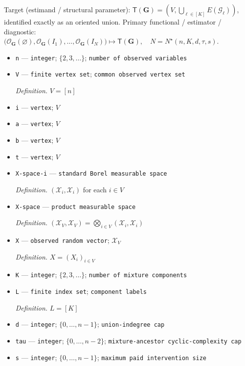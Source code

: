 \documentclass{article}
\begin{document}
Target (estimand / structural parameter): \(\mathsf T(\mathbf G)=(V,\bigcup_{\ell\in[K]}E(\mathcal G_\ell))\), identified exactly as an oriented union.
Primary functional / estimator / diagnostic: \(\bigl(\mathcal O_{\mathbf G}(\varnothing),\mathcal O_{\mathbf G}(I_1),\ldots,\mathcal O_{\mathbf G}(I_N)\bigr)\mapsto\mathsf T(\mathbf G),\quad N=N^{\star}(n,K,d,\tau,s)\).
\begin{itemize}
  \item \texttt{n} --- \texttt{integer}; \(\{2,3,\ldots\}\); \texttt{number of observed variables}
  \item \texttt{V} --- \texttt{finite vertex set}; \texttt{common observed vertex set}
  \par\smallskip\noindent\emph{Definition.} \(V=[n]\)
  \item \texttt{i} --- \texttt{vertex}; \(V\)
  \item \texttt{a} --- \texttt{vertex}; \(V\)
  \item \texttt{b} --- \texttt{vertex}; \(V\)
  \item \texttt{t} --- \texttt{vertex}; \(V\)
  \item \texttt{X-\allowbreak{}space-\allowbreak{}i} --- \texttt{standard Borel measurable space}
  \par\smallskip\noindent\emph{Definition.} \((\mathcal X_i,\mathscr X_i)\) for each \(i\in V\)
  \item \texttt{X-\allowbreak{}space} --- \texttt{product measurable space}
  \par\smallskip\noindent\emph{Definition.} \((\mathcal X_V,\mathscr X_V)=\bigotimes_{i\in V}(\mathcal X_i,\mathscr X_i)\)
  \item \texttt{X} --- \texttt{observed random vector}; \(\mathcal X_V\)
  \par\smallskip\noindent\emph{Definition.} \(X=(X_i)_{i\in V}\)
  \item \texttt{K} --- \texttt{integer}; \(\{2,3,\ldots\}\); \texttt{number of mixture components}
  \item \texttt{L} --- \texttt{finite index set}; \texttt{component labels}
  \par\smallskip\noindent\emph{Definition.} \(L=[K]\)
  \item \texttt{d} --- \texttt{integer}; \(\{0,\ldots,n-1\}\); \texttt{union-\allowbreak{}indegree cap}
  \item \texttt{tau} --- \texttt{integer}; \(\{0,\ldots,n-2\}\); \texttt{mixture-\allowbreak{}ancestor cyclic-\allowbreak{}complexity cap}
  \item \texttt{s} --- \texttt{integer}; \(\{0,\ldots,n-1\}\); \texttt{maximum paid intervention size}

\end{itemize}
\end{document}
